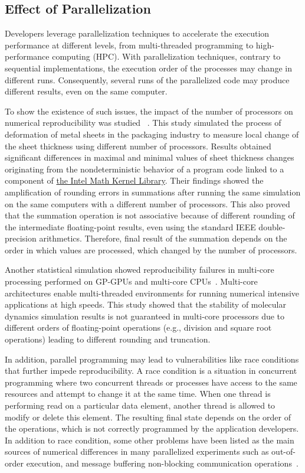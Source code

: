 \subsection{Effect of Parallelization}

Developers leverage parallelization techniques to accelerate the 
execution performance at different levels, from multi-threaded programming to 
high-performance computing (HPC). With parallelization techniques, contrary to 
sequential implementations, the execution order of the processes may 
change in different runs. Consequently, several runs of the 
parallelized code may produce different 
results, even on the same computer. 

To show the existence of such issues, the impact of the number of 
processors on numerical reproducibility was studied 
~\cite{diethelm2012limits}. This study simulated the process of 
deformation of metal sheets in the packaging industry to measure local 
change of the sheet thickness using different number of processors. 
Results obtained significant differences in maximal and minimal values of sheet thickness changes
originating from the nondeterministic behavior of a program code linked
to a component of \href{http://software.intel.com/en-us/intel-mkl}{the Intel Math Kernel Library}.
Their findings showed the amplification of rounding errors in summations after running the same 
simulation on the same computers with a different number of processors. 
This also proved that the summation operation is not associative because of 
different rounding of the intermediate floating-point results, even 
using the standard IEEE double-precision arithmetics. Therefore, final 
result of the summation depends on the order in which values are 
processed, which changed by the number of processors. 

Another statistical simulation showed reproducibility failures in 
multi-core processing performed on GP-GPUs and multi-core 
CPUs~\cite{taufer2010improving}. Multi-core architectures enable 
multi-threaded environments for running numerical intensive applications 
at high speeds. This study showed that the stability of molecular 
dynamics simulation results is not guaranteed in multi-core processors 
due to different orders of floating-point operations (e.g., 
division and square root operations) leading
to different rounding and truncation. 

In addition, parallel programming may lead to vulnerabilities like race conditions that 
further impede reproducibility. A race condition is a situation in 
concurrent programming where two concurrent threads or processes have 
access to the same resources and attempt to change it at the same time. 
When one thread is performing read on a particular data element, 
another thread is allowed to modify or delete this element. The 
resulting final state depends on the order of the operations, which 
is not correctly programmed by the application developers. In addition to race condition, 
some other problems have been listed as the main sources of numerical 
differences in many parallelized experiments such as out-of-order 
execution, and message buffering non-blocking communication 
operations~\cite{revol2014numerical}. 

